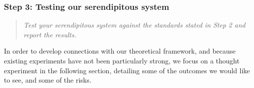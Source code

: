 \subsubsection*{Step 3: Testing our serendipitous system}

\begin{quote} {\em Test your serendipitous system against the standards stated in Step 2 and report the
results.}\end{quote}

In order to develop connections with our theoretical framework, and
because existing experiments have not been particularly strong, we
focus on a thought experiment in the following section, detailing some
of the outcomes we would like to see, and some of the risks.



